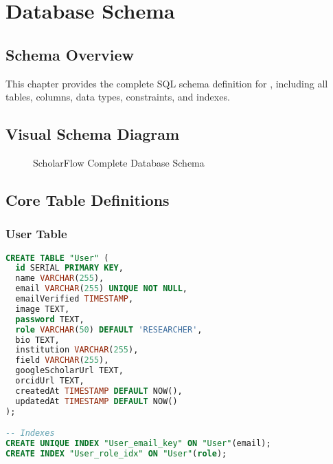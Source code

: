\chapter{Database Schema}
\label{ch:database-schema}

\section{Schema Overview}
\label{sec:schema-overview}

This chapter provides the complete SQL schema definition for \projectname{}, including all tables, columns, data types, constraints, and indexes.

\section{Visual Schema Diagram}
\label{sec:schema-diagram}

\begin{figure}[H]
\centering
{}
\caption{ScholarFlow Complete Database Schema}
\label{fig:schema-complete}
\end{figure}

\section{Core Table Definitions}
\label{sec:schema-tables}

\subsection{User Table}

\begin{lstlisting}[language=SQL, caption={User Table Schema}]
CREATE TABLE "User" (
  id SERIAL PRIMARY KEY,
  name VARCHAR(255),
  email VARCHAR(255) UNIQUE NOT NULL,
  emailVerified TIMESTAMP,
  image TEXT,
  password TEXT,
  role VARCHAR(50) DEFAULT 'RESEARCHER',
  bio TEXT,
  institution VARCHAR(255),
  field VARCHAR(255),
  googleScholarUrl TEXT,
  orcidUrl TEXT,
  createdAt TIMESTAMP DEFAULT NOW(),
  updatedAt TIMESTAMP DEFAULT NOW()
);

-- Indexes
CREATE UNIQUE INDEX "User_email_key" ON "User"(email);
CREATE INDEX "User_role_idx" ON "User"(role);
\end{lstlisting}

